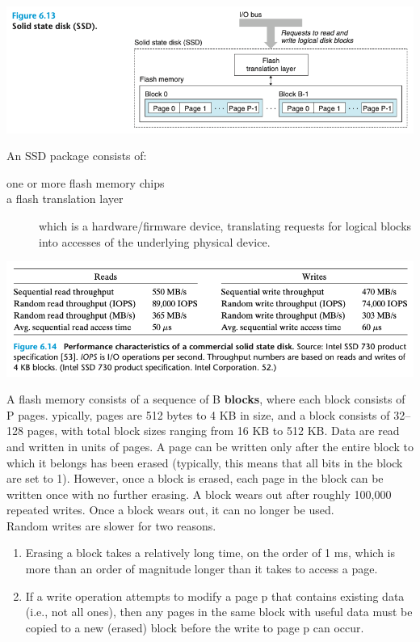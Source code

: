\documentclass[11pt]{article}
\begin{document}
\begin{center}
\includegraphics[width=.9\linewidth]{pics/figure6.13-ssd.png}
\end{center}

An SSD package consists of:\\
\begin{description}
\item[{one or more flash memory chips}] 

\item[{a flash translation layer}] which is a hardware/firmware device, translating requests for logical blocks into accesses of the underlying physical device.\\
\end{description}

\begin{center}
\includegraphics[width=.9\linewidth]{pics/figure6.14-ssd-performance.png}
\end{center}


A flash memory consists of a sequence of B \textbf{blocks}, where each block consists of P pages. ypically, pages are 512 bytes to 4 KB in size, and a block consists of 32–128 pages, with total block sizes ranging from 16 KB to 512 KB. Data are read and written in units of pages. A page can be written only after the entire block to which it belongs has been erased (typically, this means that all bits in the block are set to 1). However, once a block is erased, each page in the block can be written once with no further erasing. A block wears out after roughly 100,000 repeated writes. Once a block wears out, it can no longer be used.\\

Random writes are slower for two reasons.\\
\begin{enumerate}
\item Erasing a block takes a relatively long time, on the order of 1 ms, which is more than an order of magnitude longer than it takes to access a page.\\
\item If a write operation attempts to modify a page p that contains existing data (i.e., not all ones), then any pages in the same block with useful data must be copied to a new (erased) block before the write to page p can occur.\\
\end{enumerate}
\end{document}
